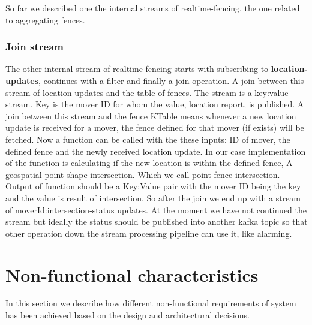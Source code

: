 \documentclass[a4]{report}
\begin{document}
    So far we described one the internal streams of realtime-fencing, the one related to aggregating fences.

    \subsubsection{Join stream}
    The other internal stream of realtime-fencing starts with subscribing to \textbf{location-updates}, continues with a
    filter and finally a join operation.
    A join between this stream of location updates and the table of fences.
    The stream is a key:value stream.
    Key is the mover ID for whom the value, location report, is published.
    A join between this stream and the fence KTable means whenever a new location update is received for a mover,
    the fence defined for that mover (if exists) will be fetched.
    Now a function can be called with the these inputs: ID of mover, the defined fence and the newly received location update.
    In our case implementation of the function is calculating if the new location is within the defined fence, A
    geospatial point-shape intersection.
    Which we call point-fence intersection.
    Output of function should be a Key:Value pair with the mover ID being the key and the value is result of
    intersection.
    So after the join we end up with a stream of moverId:intersection-status updates.
    At the moment we have not continued the stream but ideally the status should be published into another kafka
    topic so that other operation down the stream processing pipeline can use it, like alarming.


    \section{Non-functional characteristics}
    In this section we describe how different non-functional requirements of system has been achieved based on the
    design and architectural decisions.
\end{document}
